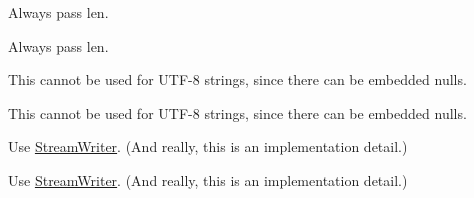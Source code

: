 \begin{DoxyRefList}
\item[\label{deprecated__deprecated000001}%
\hypertarget{deprecated__deprecated000001}{}%
Member \hyperlink{class_json_1_1_value_aa52f7873b95d29627d6e83ba96f69aaa}{Json\+:\+:Value\+:\+:remove\+Member} (const char $\ast$key)]


\item[\label{deprecated__deprecated000003}%
\hypertarget{deprecated__deprecated000003}{}%
Member \hyperlink{class_json_1_1_value_a29f3a30f7e5d3af6f38d57999bf5b480}{Json\+:\+:Value\+:\+:set\+Comment} (const char $\ast$comment, Comment\+Placement placement)]Always pass len. 

Always pass len.  
\item[\label{deprecated__deprecated000004}%
\hypertarget{deprecated__deprecated000004}{}%
Member \hyperlink{class_json_1_1_value_iterator_base_a54765da6759fd3f1edcbfbaf308ec263}{Json\+:\+:Value\+Iterator\+Base\+:\+:member\+Name} () const]This cannot be used for U\+T\+F-\/8 strings, since there can be embedded nulls. 

This cannot be used for U\+T\+F-\/8 strings, since there can be embedded nulls.  
\item[\label{deprecated__deprecated000007}%
\hypertarget{deprecated__deprecated000007}{}%
Class \hyperlink{class_json_1_1_writer}{Json\+:\+:Writer} ]Use \hyperlink{class_json_1_1_stream_writer}{Stream\+Writer}. (And really, this is an implementation detail.) 

Use \hyperlink{class_json_1_1_stream_writer}{Stream\+Writer}. (And really, this is an implementation detail.) 
\end{DoxyRefList}